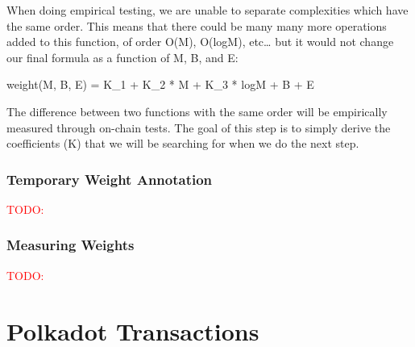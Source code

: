\documentclass[11pt,a4paper]{article}
\newcommand{\todo}[1]{\textcolor{red}{TODO: #1}}
\begin{document}
When doing empirical testing, we are unable to separate complexities which have the
same order. This means that there could be many many more operations added to this
function, of order O(M), O(logM), etc… but it would not change our final formula
as a function of M, B, and E:

weight(M, B, E) = K\_1 + K\_2 * M + K\_3 * logM + B + E

The difference between two functions with the same order will be empirically
measured through on-chain tests. The goal of this step is to simply derive the
coefficients (K) that we will be searching for when we do the next step.

\subsubsection{Temporary Weight Annotation}
\todo{}

\subsubsection{Measuring Weights}
\todo{}

\section{Polkadot Transactions}
\end{document}

